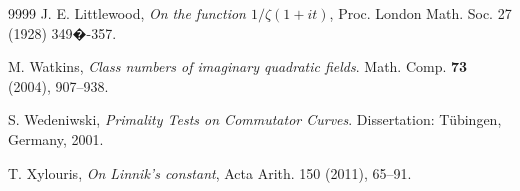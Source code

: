 \documentclass [12pt]{amsart}
\numberwithin{equation}{section}
\begin{document}
\begin{thebibliography}{9999}
 J. E. Littlewood, {\it On the function $1/\zeta(1+it)$}, Proc. London Math. Soc. 27 (1928) 349�-357.






 M. Watkins, {\it Class numbers of imaginary quadratic fields}.  Math. Comp. {\bf 73} (2004), 907--938.


 S. Wedeniwski, {\it Primality Tests on Commutator Curves}.  Dissertation: T{\" u}bingen, Germany, 2001.

 T. Xylouris, {\it On Linnik's constant},  Acta Arith. 150 (2011), 65--91.

\end{thebibliography}
\end{document}
